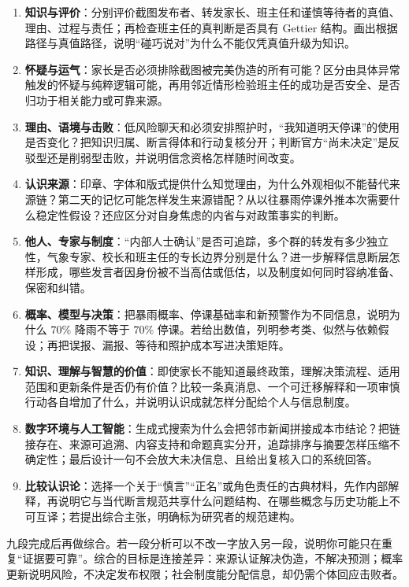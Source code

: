 \begin{enumerate}
\item \textbf{知识与评价}：分别评价截图发布者、转发家长、班主任和谨慎等待者的真值、理由、过程与责任；再检查班主任的真判断是否具有 Gettier 结构。画出根据路径与真值路径，说明“碰巧说对”为什么不能仅凭真值升级为知识。
\item \textbf{怀疑与运气}：家长是否必须排除截图被完美伪造的所有可能？区分由具体异常触发的怀疑与纯粹逻辑可能，再用邻近情形检验班主任的成功是否安全、是否归功于相关能力或可靠来源。
\item \textbf{理由、语境与击败}：低风险聊天和必须安排照护时，“我知道明天停课”的使用是否变化？把知识归属、断言得体和行动复核分开；判断官方“尚未决定”是反驳型还是削弱型击败，并说明信念资格怎样随时间改变。
\item \textbf{认识来源}：印章、字体和版式提供什么知觉理由，为什么外观相似不能替代来源链？第二天的记忆可能怎样发生来源错配？从以往暴雨停课外推本次需要什么稳定性假设？还应区分对自身焦虑的内省与对政策事实的判断。
\item \textbf{他人、专家与制度}：“内部人士确认”是否可追踪，多个群的转发有多少独立性，气象专家、校长和班主任的专长边界分别是什么？进一步解释信息断层怎样形成，哪些发言者因身份被不当高估或低估，以及制度如何同时容纳准备、保密和纠错。
\item \textbf{概率、模型与决策}：把暴雨概率、停课基础率和新预警作为不同信息，说明为什么 \(70\%\) 降雨不等于 \(70\%\) 停课。若给出数值，列明参考类、似然与依赖假设；再把误报、漏报、等待和照护成本写进决策矩阵。
\item \textbf{知识、理解与智慧的价值}：即使家长不能知道最终政策，理解决策流程、适用范围和更新条件是否仍有价值？比较一条真消息、一个可迁移解释和一项审慎行动各自增加了什么，并说明认识成就怎样分配给个人与信息制度。
\item \textbf{数字环境与人工智能}：生成式搜索为什么会把邻市新闻拼接成本市结论？把链接存在、来源可追溯、内容支持和命题真实分开，追踪排序与摘要怎样压缩不确定性；最后设计一句不会放大未决信息、且给出复核入口的系统回答。
\item \textbf{比较认识论}：选择一个关于“慎言”“正名”或角色责任的古典材料，先作内部解释，再说明它与当代断言规范共享什么问题结构、在哪些概念与历史功能上不可互译；若提出综合主张，明确标为研究者的规范建构。
\end{enumerate}

九段完成后再做综合。若一段分析可以不改一字放入另一段，说明你可能只在重复“证据要可靠”。综合的目标是连接差异：来源认证解决伪造，不解决预测；概率更新说明风险，不决定发布权限；社会制度能分配信息，却仍需个体回应击败者。

